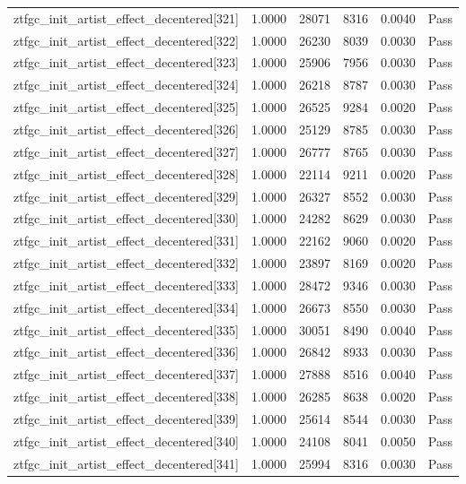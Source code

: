 \begin{table}[htbp]
\begin{tabular}{llrrll}
ztfgc\_init\_artist\_effect\_decentered[321] & 1.0000 & 28071 & 8316 & 0.0040 & Pass \\
ztfgc\_init\_artist\_effect\_decentered[322] & 1.0000 & 26230 & 8039 & 0.0030 & Pass \\
ztfgc\_init\_artist\_effect\_decentered[323] & 1.0000 & 25906 & 7956 & 0.0030 & Pass \\
ztfgc\_init\_artist\_effect\_decentered[324] & 1.0000 & 26218 & 8787 & 0.0030 & Pass \\
ztfgc\_init\_artist\_effect\_decentered[325] & 1.0000 & 26525 & 9284 & 0.0020 & Pass \\
ztfgc\_init\_artist\_effect\_decentered[326] & 1.0000 & 25129 & 8785 & 0.0030 & Pass \\
ztfgc\_init\_artist\_effect\_decentered[327] & 1.0000 & 26777 & 8765 & 0.0030 & Pass \\
ztfgc\_init\_artist\_effect\_decentered[328] & 1.0000 & 22114 & 9211 & 0.0020 & Pass \\
ztfgc\_init\_artist\_effect\_decentered[329] & 1.0000 & 26327 & 8552 & 0.0030 & Pass \\
ztfgc\_init\_artist\_effect\_decentered[330] & 1.0000 & 24282 & 8629 & 0.0030 & Pass \\
ztfgc\_init\_artist\_effect\_decentered[331] & 1.0000 & 22162 & 9060 & 0.0020 & Pass \\
ztfgc\_init\_artist\_effect\_decentered[332] & 1.0000 & 23897 & 8169 & 0.0020 & Pass \\
ztfgc\_init\_artist\_effect\_decentered[333] & 1.0000 & 28472 & 9346 & 0.0030 & Pass \\
ztfgc\_init\_artist\_effect\_decentered[334] & 1.0000 & 26673 & 8550 & 0.0030 & Pass \\
ztfgc\_init\_artist\_effect\_decentered[335] & 1.0000 & 30051 & 8490 & 0.0040 & Pass \\
ztfgc\_init\_artist\_effect\_decentered[336] & 1.0000 & 26842 & 8933 & 0.0030 & Pass \\
ztfgc\_init\_artist\_effect\_decentered[337] & 1.0000 & 27888 & 8516 & 0.0040 & Pass \\
ztfgc\_init\_artist\_effect\_decentered[338] & 1.0000 & 26285 & 8638 & 0.0020 & Pass \\
ztfgc\_init\_artist\_effect\_decentered[339] & 1.0000 & 25614 & 8544 & 0.0030 & Pass \\
ztfgc\_init\_artist\_effect\_decentered[340] & 1.0000 & 24108 & 8041 & 0.0050 & Pass \\
ztfgc\_init\_artist\_effect\_decentered[341] & 1.0000 & 25994 & 8316 & 0.0030 & Pass \\

\end{tabular}
\end{table}
